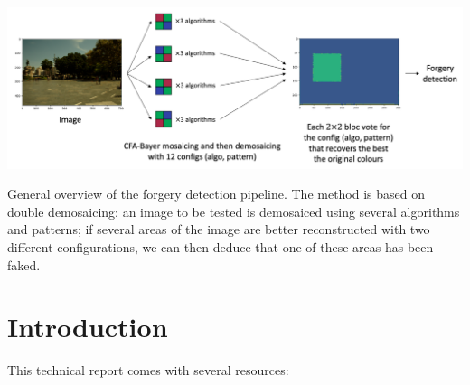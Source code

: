 \documentclass[sigconf, nonacm]{acmart}
\begin{document}

\begin{teaserfigure}
  \includegraphics[width=\textwidth]{teaser}
  \caption{General overview of the forgery detection pipeline. {\normalfont The method is based on double demosaicing: an image to be tested is demosaiced using several algorithms and patterns; if several areas of the image are better reconstructed with two different configurations, we can then deduce that one of these areas has been faked.}}
  \label{fig:teaser}
\end{teaserfigure}


\maketitle

\section{Introduction} \label{sec:introduction}

This technical report comes with several resources:
\end{document}
